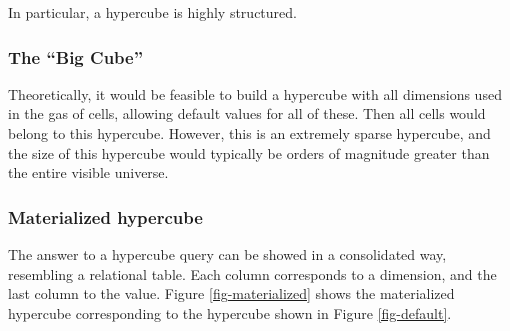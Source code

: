 \documentclass{acm_proc_article-sp}
\begin{document}
In particular, a hypercube is highly structured.

\subsubsection{The ``Big Cube''}
Theoretically, it would be feasible to build a hypercube with all dimensions used in the gas of cells, allowing default values for all of these. Then all cells would belong to this hypercube. However, this is an extremely sparse hypercube, and the size of this hypercube would typically be orders of magnitude greater than the entire visible universe.

\subsubsection{Materialized hypercube}

The answer to a hypercube query can be showed in a consolidated way, resembling a relational table. Each column corresponds to a dimension, and the last column to the value. Figure \ref{fig-materialized} shows the materialized hypercube corresponding to the hypercube shown in Figure \ref{fig-default}.
\end{document}
